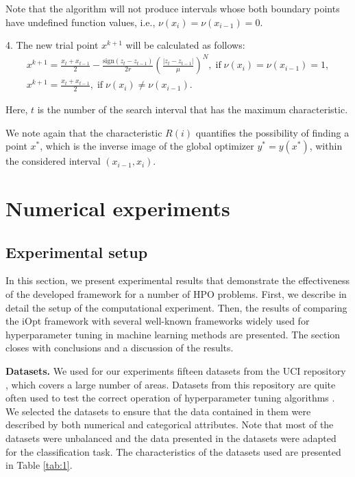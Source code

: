 \documentclass[preprint,12pt]{elsarticle}
\begin{document}
Note that the algorithm will not produce intervals whose both boundary points have undefined function values, i.e., $\nu(x_i) = \nu(x_{i-1}) = 0$.

4. The new trial point $x^{k+1}$ will be calculated as follows:
\begin{gather}\label{xk1_int}
x^{k+1} = \frac{x_t+x_{t-1}}{2}- \frac{\mathrm{sign}(z_t-z_{t-1})}{2r} \left(\frac{\left|z_t-z_{t-1}\right|}{\mu}\right)^N, \; \mathrm{if} \; \nu(x_i) = \nu(x_{i-1}) = 1, \nonumber \\    
x^{k+1} = \frac{x_t+x_{t-1}}{2} , \; \mathrm{if} \; \nu(x_i) \neq \nu(x_{i-1}). \nonumber
\end{gather}

Here, $t$ is the number of the search interval that has the maximum characteristic.

We note again that the characteristic $R(i)$ quantifies the possibility of finding a point $x^*$, which is the inverse image of the global optimizer $y^* = y(x^*)$, within the considered interval $(x_{i-1},x_i)$.

\section{Numerical experiments}
\label{sec_exp}

\subsection{Experimental setup}
In this section, we present experimental results that demonstrate the effectiveness of the developed framework for a number of HPO problems. First, we describe in detail the setup of the computational experiment. Then, the results of comparing the iOpt framework with several well-known frameworks widely used for hyperparameter tuning in machine learning methods are presented. The section closes with conclusions and a discussion of the results.


\textbf{Datasets.} 
We used for our experiments fifteen datasets from the UCI repository \cite{AsuncionNewman2007}, which covers a large number of areas. Datasets from this repository are quite often used to test the correct operation of hyperparameter tuning algorithms \cite{WU2023110160,Wang2021,Joy2020}. We selected the datasets to ensure that the data contained in them were described by both numerical and categorical attributes. Note that most of the datasets were unbalanced and the data presented in the datasets were adapted for the classification task.  The characteristics of the datasets used are presented in Table \ref{tab:1}.
\end{document}
